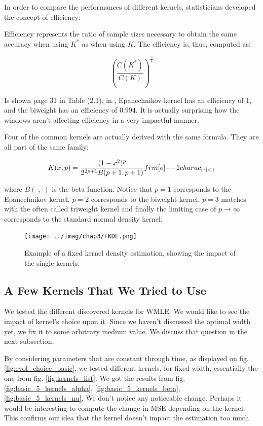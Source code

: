 \documentclass[11pt]{book}
\begin{document}
In order to compare the performances of different kernels, statisticians developed the concept of efficiency:

\begin{definition}
Efficiency represents the ratio of sample sizes necessary
to obtain the same accuracy when using $K^*$ as when using $K$. The efficiency is, thus, computed as:

$$ \left ( \frac{C(K^*)}{C(K)} \right ) ^{\frac 5 4 } $$
\end{definition}

Is shown page 31 in Table (2.1), in \cite{Wand}, Epanechnikov kernel has an efficiency of $1$, and the biweight has an efficiency of $0.994$. It is actually surprising how the windows aren't affecting efficiency in a very impactful manner.



\begin{remarque}
Four of the common kernels are actually derived with the same formula. They are all part of the same family:

$$ K(x,p) = \frac{(1-x^2)^p}{2^{2p+1} B(p+1,p+1) } \11charac_{\abs x < 1 }$$

where $B(\cdot, \cdot)$ is the beta function. Notice that $p=1$ corresponds to the Epanechnikov kernel, $p=2$ corresponds to the biweight kernel, $p=3$ matches with the often called triweight kernel and finally the limiting case of $p \to \infty$ corresponds to the standard normal density kernel. 
\end{remarque}


\begin{figure}
\centering
\texttt{[image: ../imag/chap3/FKDE.png]}
\caption{Example of a fixed kernel density estimation, showing the impact of the single kernels.}
\label{fig:FKDE}
\end{figure}

\subsection{A Few Kernels That We Tried to Use}
\label{section_few_trials_kernels}

We tested the different discovered kernels for WMLE. We would like to see the impact of kernel's choice upon it. Since we haven't discussed the optimal width yet, we fix it to some arbitrary medium value. We discuss that question in the next subsection.

By considering parameters that are constant through time, as displayed on fig. \ref{fig:evol_choice_basic}, we tested different kernels, for fixed width, essentially the one from fig. \ref{fig:kernels_list}. We got the results from fig. \ref{fig:basic_5_kernels_alpha}, \ref{fig:basic_5_kernels_beta}, \ref{fig:basic_5_kernels_nu}. We don't notice any noticeable change. Perhaps it would be interesting to compute the change in MSE depending on the kernel. This confirms our idea that the kernel doesn't impact the estimation too much.
\end{document}
